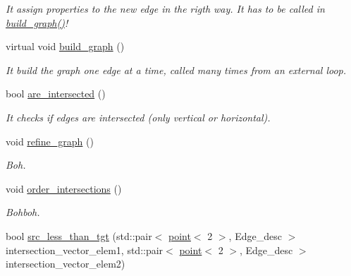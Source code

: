 \begin{DoxyCompactItemize}
\begin{DoxyCompactList}\small\item\em It assign properties to the new edge in the rigth way. It has to be called in \hyperlink{classreader__Formaggia_a491d681e3a8c1bfd5f11e1a257235bd7}{build\_\-graph()}! \item\end{DoxyCompactList}\item 
virtual void \hyperlink{classreader__Formaggia_a491d681e3a8c1bfd5f11e1a257235bd7}{build\_\-graph} ()
\begin{DoxyCompactList}\small\item\em It build the graph one edge at a time, called many times from an external loop. \item\end{DoxyCompactList}\item 
\hypertarget{classreader__Formaggia_a840352c74f30f01196e655555e7dcebf}{
bool \hyperlink{classreader__Formaggia_a840352c74f30f01196e655555e7dcebf}{are\_\-intersected} ()}
\label{classreader__Formaggia_a840352c74f30f01196e655555e7dcebf}

\begin{DoxyCompactList}\small\item\em It checks if edges are intersected (only vertical or horizontal). \item\end{DoxyCompactList}\item 
\hypertarget{classreader__Formaggia_ad8487afd57cf97c784bdb23aa84afa14}{
void \hyperlink{classreader__Formaggia_ad8487afd57cf97c784bdb23aa84afa14}{refine\_\-graph} ()}
\label{classreader__Formaggia_ad8487afd57cf97c784bdb23aa84afa14}

\begin{DoxyCompactList}\small\item\em Boh. \item\end{DoxyCompactList}\item 
\hypertarget{classreader__Formaggia_a0d4a321a3cef75d8176980009ab1d89a}{
void \hyperlink{classreader__Formaggia_a0d4a321a3cef75d8176980009ab1d89a}{order\_\-intersections} ()}
\label{classreader__Formaggia_a0d4a321a3cef75d8176980009ab1d89a}

\begin{DoxyCompactList}\small\item\em Bohboh. \item\end{DoxyCompactList}\item 
\hypertarget{classreader__Formaggia_ae2eb45f35a88468742cea01d08f3c2eb}{
bool \hyperlink{classreader__Formaggia_ae2eb45f35a88468742cea01d08f3c2eb}{src\_\-less\_\-than\_\-tgt} (std::pair$<$ \hyperlink{classpoint}{point}$<$ 2 $>$, Edge\_\-desc $>$ intersection\_\-vector\_\-elem1, std::pair$<$ \hyperlink{classpoint}{point}$<$ 2 $>$, Edge\_\-desc $>$ intersection\_\-vector\_\-elem2)}
\label{classreader__Formaggia_ae2eb45f35a88468742cea01d08f3c2eb}


\end{DoxyCompactItemize}
